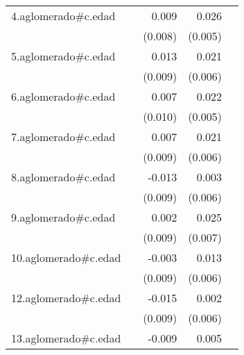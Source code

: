 {\begin{longtable}{l*{4}{D{.}{.}{-1}}}
\addlinespace
4.aglomerado#c.edad&                     &       0.009         &       0.026\sym{***}&                     \\
            &                     &     (0.008)         &     (0.005)         &                     \\
\addlinespace
5.aglomerado#c.edad&                     &       0.013         &       0.021\sym{***}&                     \\
            &                     &     (0.009)         &     (0.006)         &                     \\
\addlinespace
6.aglomerado#c.edad&                     &       0.007         &       0.022\sym{***}&                     \\
            &                     &     (0.010)         &     (0.005)         &                     \\
\addlinespace
7.aglomerado#c.edad&                     &       0.007         &       0.021\sym{***}&                     \\
            &                     &     (0.009)         &     (0.006)         &                     \\
\addlinespace
8.aglomerado#c.edad&                     &      -0.013         &       0.003         &                     \\
            &                     &     (0.009)         &     (0.006)         &                     \\
\addlinespace
9.aglomerado#c.edad&                     &       0.002         &       0.025\sym{***}&                     \\
            &                     &     (0.009)         &     (0.007)         &                     \\
\addlinespace
10.aglomerado#c.edad&                     &      -0.003         &       0.013\sym{*}  &                     \\
            &                     &     (0.009)         &     (0.006)         &                     \\
\addlinespace
12.aglomerado#c.edad&                     &      -0.015         &       0.002         &                     \\
            &                     &     (0.009)         &     (0.006)         &                     \\
\addlinespace
13.aglomerado#c.edad&                     &      -0.009         &       0.005         &                     \\

\end{longtable}}
